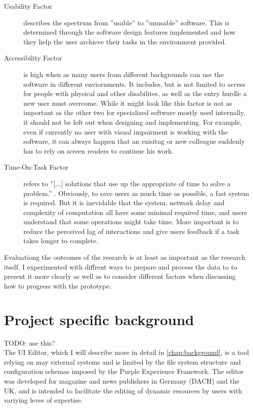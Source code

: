 \begin{description}
  \item[Usability Factor] describes the spectrum from ''usable'' to ''unusable'' software. This is determined through the software design features implemented and how they help the user archieve their tasks in the environment provided.
  \item[Accessibility Factor] is high when as many users from different backgrounds can use the software in different enviornments. It includes, but is not limited to access for people with physical and other disabilites, as well as the entry hurdle a new user must overcome.
While it might look like this factor is not as important as the other two for specialized software mostly used internally, it should not be left out when designing and implementing. For example, even if currently no user with visual impairment is working with the software, it can always happen that an exisitng or new colleague suddenly has to rely on screen readers to continue his work.
  \item[Time-On-Task Factor] refers to ''[...] solutions that use up the appropriate of time to solve a problem.'' \Cite[p. 40]{LearnHCI:2020ys}. Obviously, to save users as much time as possible, a fast system is required.
But it is inevidable that the system, network delay and complexity of computation all have some minimal required time, and users understand that some operations might take time. More important is to reduce the perceived lag of interactions and give users feedback if a task takes longer to complete.
\end{description}
Evaluationg the outcomes of the research is at least as important as the research itself.
I experimented with diffrent ways to prepare and process the data to to present it more clearly as well as to consider different factors when discussing how to progress with the prototype.

\section{Project specific background}


TODO: use this?
\\
The UI Editor, which I will describe more in detail in \ref{chap:background}, is a tool relying on may external systems and is limited by the file system structure and configuration schemas imposed by the Purple Experience Franework. The editor was developed for magazine and news publishers in Germany (DACH) and the UK, and is intended to facilitate the editing of dynamic resources by users with variying leves of expertise.
\\

